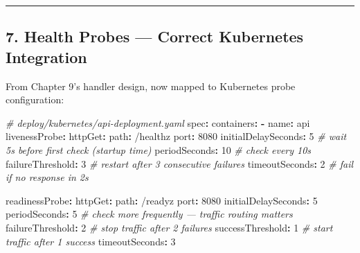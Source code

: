 \documentclass[
]{article}
\newenvironment{Shaded}{}{}
\newcommand{\AttributeTok}[1]{\textcolor[rgb]{0.49,0.56,0.16}{#1}}
\newcommand{\CommentTok}[1]{\textcolor[rgb]{0.38,0.63,0.69}{\textit{#1}}}
\newcommand{\DecValTok}[1]{\textcolor[rgb]{0.25,0.63,0.44}{#1}}
\newcommand{\FunctionTok}[1]{\textcolor[rgb]{0.02,0.16,0.49}{#1}}
\newcommand{\KeywordTok}[1]{\textcolor[rgb]{0.00,0.44,0.13}{\textbf{#1}}}
\begin{document}
\begin{center}\rule{0.5\linewidth}{0.5pt}\end{center}

\hypertarget{health-probes-correct-kubernetes-integration}{%
\subsection{7. Health Probes --- Correct Kubernetes
Integration}\label{health-probes-correct-kubernetes-integration}}

From Chapter 9's handler design, now mapped to Kubernetes probe
configuration:

\begin{Shaded}
\begin{Highlighting}[]
\CommentTok{\# deploy/kubernetes/api{-}deployment.yaml}
\FunctionTok{spec}\KeywordTok{:}
\AttributeTok{  }\FunctionTok{containers}\KeywordTok{:}
\AttributeTok{  }\KeywordTok{{-}}\AttributeTok{ }\FunctionTok{name}\KeywordTok{:}\AttributeTok{ api}
\AttributeTok{    }\FunctionTok{livenessProbe}\KeywordTok{:}
\AttributeTok{      }\FunctionTok{httpGet}\KeywordTok{:}
\AttributeTok{        }\FunctionTok{path}\KeywordTok{:}\AttributeTok{ /healthz}
\AttributeTok{        }\FunctionTok{port}\KeywordTok{:}\AttributeTok{ }\DecValTok{8080}
\AttributeTok{      }\FunctionTok{initialDelaySeconds}\KeywordTok{:}\AttributeTok{ }\DecValTok{5}\CommentTok{      \# wait 5s before first check (startup time)}
\AttributeTok{      }\FunctionTok{periodSeconds}\KeywordTok{:}\AttributeTok{ }\DecValTok{10}\CommentTok{           \# check every 10s}
\AttributeTok{      }\FunctionTok{failureThreshold}\KeywordTok{:}\AttributeTok{ }\DecValTok{3}\CommentTok{         \# restart after 3 consecutive failures}
\AttributeTok{      }\FunctionTok{timeoutSeconds}\KeywordTok{:}\AttributeTok{ }\DecValTok{2}\CommentTok{           \# fail if no response in 2s}

\AttributeTok{    }\FunctionTok{readinessProbe}\KeywordTok{:}
\AttributeTok{      }\FunctionTok{httpGet}\KeywordTok{:}
\AttributeTok{        }\FunctionTok{path}\KeywordTok{:}\AttributeTok{ /readyz}
\AttributeTok{        }\FunctionTok{port}\KeywordTok{:}\AttributeTok{ }\DecValTok{8080}
\AttributeTok{      }\FunctionTok{initialDelaySeconds}\KeywordTok{:}\AttributeTok{ }\DecValTok{5}
\AttributeTok{      }\FunctionTok{periodSeconds}\KeywordTok{:}\AttributeTok{ }\DecValTok{5}\CommentTok{            \# check more frequently — traffic routing matters}
\AttributeTok{      }\FunctionTok{failureThreshold}\KeywordTok{:}\AttributeTok{ }\DecValTok{2}\CommentTok{         \# stop traffic after 2 failures}
\AttributeTok{      }\FunctionTok{successThreshold}\KeywordTok{:}\AttributeTok{ }\DecValTok{1}\CommentTok{         \# start traffic after 1 success}
\AttributeTok{      }\FunctionTok{timeoutSeconds}\KeywordTok{:}\AttributeTok{ }\DecValTok{3}
\end{Highlighting}
\end{Shaded}
\end{document}

